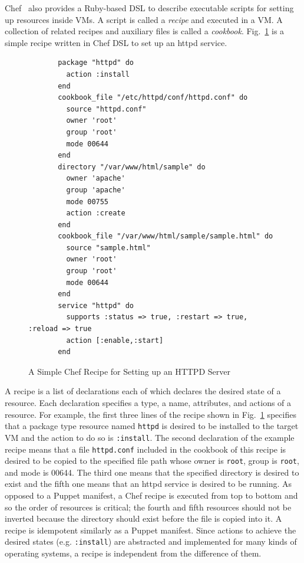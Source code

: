 \documentclass[12pt]{report}
\begin{document}
Chef~\cite{Chef} also provides a Ruby-based DSL to describe executable
scripts for setting up resources inside VMs. A script is called a {\it recipe}
and executed in a VM. A collection of related recipes and auxiliary
files is called a {\it cookbook}.  Fig.~\ref{fig:ChefExample} is a
simple recipe written in Chef DSL to set up an httpd service.
\begin{figure}
\small
\begin{verbatim}
       package "httpd" do
         action :install
       end
       cookbook_file "/etc/httpd/conf/httpd.conf" do
         source "httpd.conf"
         owner 'root'
         group 'root'
         mode 00644
       end
       directory "/var/www/html/sample" do
         owner 'apache'
         group 'apache'
         mode 00755
         action :create
       end
       cookbook_file "/var/www/html/sample/sample.html" do
         source "sample.html"
         owner 'root'
         group 'root'
         mode 00644
       end
       service "httpd" do
         supports :status => true, :restart => true, :reload => true
         action [:enable,:start]
       end
\end{verbatim}
\normalsize
\vspace{-0.6cm}
\caption{A Simple Chef Recipe for Setting up an HTTPD Server}
\label{fig:ChefExample}
\end{figure}
A recipe is a list of declarations each of which declares the desired
state of a resource. Each declaration specifies a type, a name,
attributes, and actions of a resource. For example, the first three
lines of the recipe shown in Fig.~\ref{fig:ChefExample} specifies that
a package type resource named {\tt httpd} is desired to be installed to
the target VM and the action to do so is {\tt :install}. The second
declaration of the example recipe means that a file {\tt httpd.conf}
included in the cookbook of this recipe is desired to be copied to the
specified file path whose owner is {\tt root}, group is {\tt root},
and mode is 00644. The third one means that the specified directory is
desired to exist and the fifth one means that an httpd service is
desired to be running. As opposed to a Puppet manifest, a Chef recipe
is executed from top to bottom and so the order of resources is
critical; the fourth and fifth resources should not be inverted
because the directory should exist before the file is copied into
it. A recipe is idempotent similarly as a Puppet manifest. Since
actions to achieve the desired states (e.g. {\tt :install}) are
abstracted and implemented for many kinds of operating systems, a
recipe is independent from the difference of them.
\end{document}
